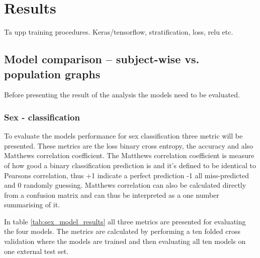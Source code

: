 \chapter{Results}

Ta upp training procedures. Keras/tensorflow, stratification, loss, relu etc.

\section{Model comparison -- subject-wise vs. population graphs}
Before presenting the result of the analysis the models need to be evaluated. 

\subsection{Sex - classification}
To evaluate the models performance for sex classification three metric will be presented. These metrics are the loss binary cross entropy, the accuracy and also Matthews correlation coefficient. 
The Matthews correlation coefficient is measure of how good a binary classification prediction is and it's defined to be identical to Pearsons correlation, thus +1 indicate a perfect prediction -1 all miss-predicted and 0 randomly guessing. Matthews correlation can also be calculated directly from a confusion matrix and can thus be interpreted as a  one number summarising of it. 


In table \ref{tab:sex_model_results} all three metrics are presented for evaluating the four models. The metrics are calculated by performing a ten folded cross validation where the models are trained and then evaluating all ten models on one external test set. 



